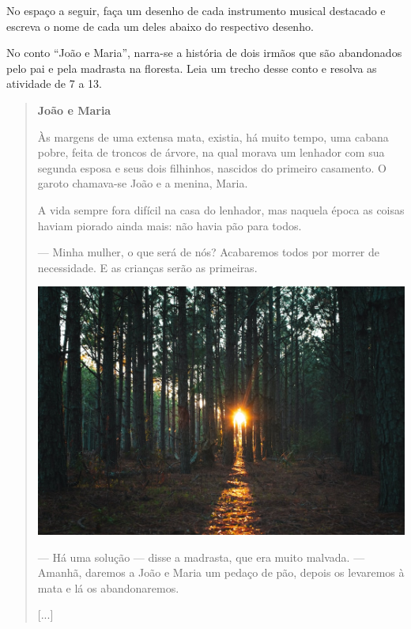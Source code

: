 No espaço a seguir, faça um desenho de cada instrumento musical
destacado e escreva o nome de cada um deles abaixo do respectivo desenho.

\begin{mdframed}[linewidth=2pt,linecolor=salmao,roundcorner=20pt]
\vspace{10cm}
\end{mdframed}

No conto ``João e Maria'', narra-se a história de dois irmãos que são
abandonados pelo pai e pela madrasta na floresta. Leia um trecho desse
conto e resolva as atividade de 7 a 13.


\begin{quote}
\textbf{João e Maria}

Às margens de uma extensa mata, existia, há muito tempo, uma cabana
pobre, feita de troncos de árvore, na qual morava um lenhador com sua segunda esposa e
seus dois filhinhos, nascidos do primeiro casamento. O garoto chamava-se João e a
menina, Maria.

A vida sempre fora difícil na casa do lenhador, mas naquela época as
coisas haviam piorado ainda mais: não havia pão para todos.

--- Minha mulher, o que será de nós? Acabaremos todos por morrer
de necessidade. E as crianças serão as primeiras.

\noindent\includegraphics[width=\textwidth]{./media/image3.jpeg}

--- Há uma solução --- disse a madrasta, que era muito
malvada. --- Amanhã, daremos a João e Maria um pedaço de pão, depois os
levaremos à mata e lá os abandonaremos.

{[}...{]}

\end{quote}

